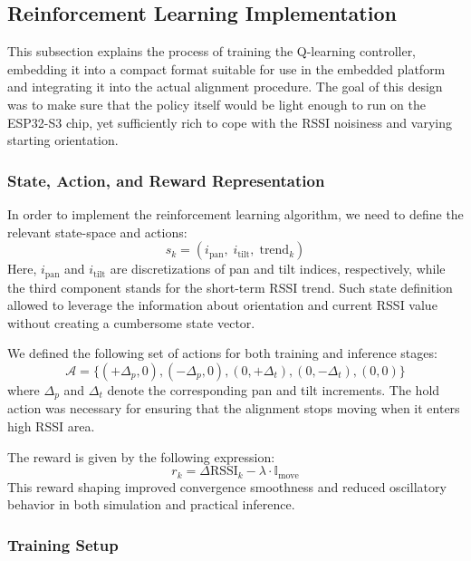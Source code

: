 \subsection{Reinforcement Learning Implementation}

This subsection explains the process of training the Q-learning controller, embedding
it into a compact format suitable for use in the embedded platform and integrating it
into the actual alignment procedure. The goal of this design was to make sure that the
policy itself would be light enough to run on the ESP32-S3 chip, yet sufficiently rich
to cope with the RSSI noisiness and varying starting orientation.

\subsubsection{State, Action, and Reward Representation}

In order to implement the reinforcement learning algorithm, we need to define the
relevant state-space and actions:
\begin{equation}
s_k = \left( i_{\text{pan}},\; i_{\text{tilt}},\; \text{trend}_k \right)
\end{equation}
Here, $i_{\text{pan}}$ and $i_{\text{tilt}}$ are discretizations of pan and tilt indices,
respectively, while the third component stands for the short-term RSSI trend. Such state
definition allowed to leverage the information about orientation and current RSSI value
without creating a cumbersome state vector.

We defined the following set of actions for both training and inference stages:
\begin{equation}
\mathcal{A} = \{(+\Delta_p,0), (-\Delta_p,0), (0,+\Delta_t), (0,-\Delta_t), (0,0)\}
\end{equation}
where $\Delta_p$ and $\Delta_t$ denote the corresponding pan and tilt increments. The
hold action was necessary for ensuring that the alignment stops moving when it enters
high RSSI area.

The reward is given by the following expression:
\begin{equation}
r_k = \Delta \text{RSSI}_k - \lambda \cdot \mathbb{I}_{\text{move}}
\end{equation}
This reward shaping improved convergence smoothness and reduced oscillatory behavior in
both simulation and practical inference.

\subsubsection{Training Setup}

